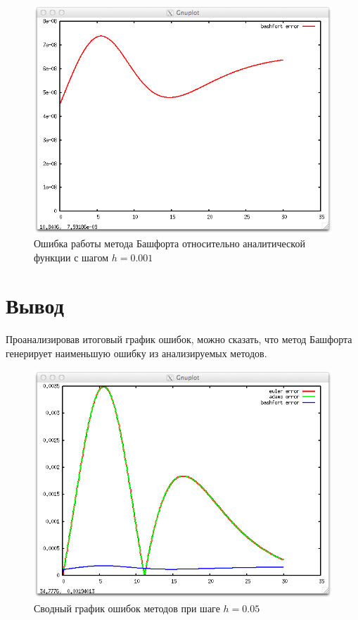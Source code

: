 \documentclass{article}
\begin{document}
  \begin{figure}
    \includegraphics[width=13cm]{bashfortError0001.png}
    \caption{Ошибка работы метода Башфорта относительно аналитической функции с
    шагом $h=0.001$}
  \end{figure}

\newpage
\section{Вывод}
Проанализировав итоговый график ошибок, можно сказать, что метод Башфорта
генерирует наименьшую ошибку из анализируемых методов.
  \begin{figure}[h!]
    \includegraphics[width=12.8cm]{compareall.png}
    \caption{Сводный график ошибок методов при шаге $h=0.05$}
  \end{figure}
  
\end{document}

